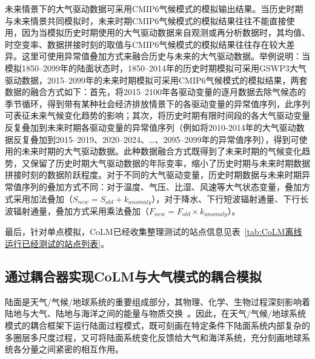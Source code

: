 未来情景下的大气驱动数据可采用CMIP6气候模式的模拟输出结果。当历史时期与未来情景共同模拟时，未来时期CMIP6气候模式的模拟结果往往不能直接使用，因为当模拟历史时期使用的大气驱动数据来自观测或再分析数据时，其均值、时空变率、数据拼接时刻的取值与CMIP6气候模式的模拟结果往往存在较大差异。这里可使用异常值叠加方式来融合历史与未来的大气驱动数据。举例说明：当模拟1850--2099年的陆面状态时，1850--2014年的历史时期模拟可采用GSWP3大气驱动数据，2015--2099年的未来时期模拟可采用CMIP6气候模式的模拟结果，两套数据的融合方式如下：首先，将2015--2100年各驱动变量的逐月数据去除气候态的季节循环，得到带有某种社会经济排放情景下的各驱动变量的异常值序列，此序列可表征未来气候变化趋势的影响；其次，将历史时期有限时间段的各大气驱动变量反复叠加到未来时期各驱动变量的异常值序列（例如将2010-2014年的大气驱动数据反复叠加到2015--2019、2020--2024、…、2095--2099年的异常值序列），得到可使用的未来时期的大气驱动数据。此种数据融合方式既得到了未来时期的气候变化趋势，又保留了历史时期大气驱动数据的年际变率，缩小了历史时期与未来时期数据拼接时刻的数据阶跃程度。对于不同的大气驱动变量，历史时期数据与未来时期异常值序列的叠加方式不同：对于温度、气压、比湿、风速等大气状态变量，叠加方式采用加法叠加（$S_{new}=S_{old}+k_{anomaly}$），对于降水、下行短波辐射通量、下行长波辐射通量，叠加方式采用乘法叠加（$F_{new}=F_{old}\times k_{anomaly}$）。


最后，针对单点模拟，CoLM已经收集整理测试的站点信息见表~\ref{tab:CoLM离线运行已经测试的站点列表}。

\subsection{通过耦合器实现CoLM与大气模式的耦合模拟}\label{CoLM与大气模式耦合}
陆面是天气/气候/地球系统的重要组成部分，其物理、化学、生物过程深刻影响着陆地与大气、陆地与海洋之间的能量与物质交换~\citep{Dai2020}。因此，在天气/气候/地球系统模式的耦合框架下运行陆面过程模式，既可刻画在特定条件下陆面系统内部复杂的多圈层多尺度过程，又可将陆面系统变化反馈给大气和海洋系统，充分刻画地球系统各分量之间紧密的相互作用。

